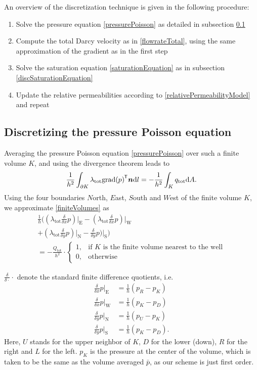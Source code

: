 \documentclass[conference]{IEEEtran}
\DeclareMathOperator*{\grad}{grad}
\renewcommand*{\d}[1]{\ensuremath{\mathrm{d}#1}}
\newcommand*{\ddiff}[2]{\ensuremath{\frac{\delta}{\delta{#2}}{#1}}}
\renewcommand*{\vec}[1]{\ensuremath{{\bm{#1}}}}
\newcommand*{\transpose}[1]{{#1}^{\mkern-1.5mu\mathsf{T}}}
\newcommand*{\iprod}[3]{\ensuremath{\ifstrempty{#1}{\transpose{#2} {#3}}{\transpose{#1} {#2} {#3}}}}
\begin{document}
An overview of the discretization technique is given in the following procedure:
\begin{enumerate}
	\item Solve the pressure equation \eqref{pressurePoisson} as detailed in subsection \ref{discPressurePoisson}
	\item Compute the total Darcy velocity as in \eqref{flowrateTotal}, using the same approximation of the gradient as in the first step
	\item Solve the saturation equation \eqref{saturationEquation} as in subsection \ref{discSaturationEquation}
	\item Update the relative permeabilities according to \eqref{relativePermeabilityModel} and repeat
\end{enumerate}

\subsection{Discretizing the pressure Poisson equation}
\label{discPressurePoisson}
Averaging the pressure Poisson equation \eqref{pressurePoisson} over such a finite volume $K$, and using the divergence theorem leads to
\begin{equation}
\label{finiteVolumes}
\frac{1}{h^2} \int_{\partial K} \lambda_\text{tot} \iprod{}{\grad(p)}{\vec{n}} \d{l} = -\frac{1}{h^2} \int_K q_\text{tot} \d{A}.
\end{equation}
Using the four boundaries $N$orth, $E$ast, $S$outh and $W$est of the finite volume $K$, we approximate \eqref{finiteVolumes} as
\begin{multline}
\frac{1}{h}\biggr( (\lambda_\text{tot} \ddiff{p}{x})\lvert_\text{E} - (\lambda_\text{tot} \ddiff{p}{x})\lvert_\text{W} \\+ (\lambda_\text{tot}\ddiff{p}{y})\lvert_\text{N}
- \ddiff{p}{y})\lvert_\text{S} \biggr) \\= - \frac{Q_\text{tot}}{h^2} \cdot \begin{cases} 1, &\text{if } K \text{ is the finite volume nearest to the well} \\
0, & \text{otherwise} \end{cases}
\end{multline}

$\ddiff{\cdot}{\cdot}$ denote the standard finite difference quotients, i.e.
\begin{align}
\label{differenceQuotients}
\ddiff{p}{x}\lvert_\text{E} &= \frac{1}{h}(p_R - p_K) \\
\ddiff{p}{x}\lvert_\text{W} &= \frac{1}{h}(p_K - p_D) \\
\ddiff{p}{y}\lvert_\text{N} &= \frac{1}{h}(p_U - p_K) \\
\ddiff{p}{y}\lvert_\text{S} &= \frac{1}{h}(p_K - p_D).
\end{align}
Here, $U$ stands for the upper neighbor of $K$, $D$ for the lower (down), $R$ for the right and $L$ for the left.
$p_K$ is the pressure at the center of the volume, which is taken to be the same as the volume averaged $\bar{p}$, as our scheme is just first order.
\end{document}
